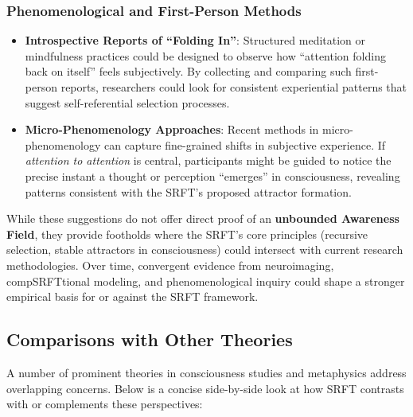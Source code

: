 \documentclass[12pt,a4paper]{article}
\begin{document}
\subsubsection{Phenomenological and First-Person Methods}
\begin{itemize}
    \item \textbf{Introspective Reports of “Folding In”}: 
    Structured meditation or mindfulness practices could be designed to observe how “attention folding back on itself” feels subjectively. By collecting and comparing such first-person reports, researchers could look for consistent experiential patterns that suggest self-referential selection processes.

    \item \textbf{Micro-Phenomenology Approaches}: 
    Recent methods in micro-phenomenology \cite{petitmengin2006} can capture fine-grained shifts in subjective experience. If \emph{attention to attention} is central, participants might be guided to notice the precise instant a thought or perception “emerges” in consciousness, revealing patterns consistent with the SRFT’s proposed attractor formation.
\end{itemize}

While these suggestions do not offer direct proof of an \textbf{unbounded Awareness Field}, they provide footholds where the SRFT’s core principles (recursive selection, stable attractors in consciousness) could intersect with current research methodologies. Over time, convergent evidence from neuroimaging, compSRFTtional modeling, and phenomenological inquiry could shape a stronger empirical basis for or against the SRFT framework.

\subsection{Comparisons with Other Theories}
\label{subsec:comparisons}

A number of prominent theories in consciousness studies and metaphysics address overlapping concerns. Below is a concise side-by-side look at how SRFT contrasts with or complements these perspectives:
\end{document}
